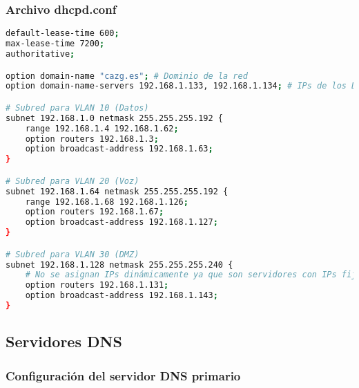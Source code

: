 \subsubsection{Archivo dhcpd.conf}
\label{Apendice2:dhcpd.conf}
\begin{lstlisting}[language=bash]
default-lease-time 600;
max-lease-time 7200;
authoritative;

option domain-name "cazg.es"; # Dominio de la red
option domain-name-servers 192.168.1.133, 192.168.1.134; # IPs de los DNS primario y secundario

# Subred para VLAN 10 (Datos)
subnet 192.168.1.0 netmask 255.255.255.192 {
    range 192.168.1.4 192.168.1.62;
    option routers 192.168.1.3; 
    option broadcast-address 192.168.1.63;
}

# Subred para VLAN 20 (Voz)
subnet 192.168.1.64 netmask 255.255.255.192 {
    range 192.168.1.68 192.168.1.126;
    option routers 192.168.1.67;
    option broadcast-address 192.168.1.127;
}

# Subred para VLAN 30 (DMZ)
subnet 192.168.1.128 netmask 255.255.255.240 {
    # No se asignan IPs dinámicamente ya que son servidores con IPs fijas
    option routers 192.168.1.131; 
    option broadcast-address 192.168.1.143;
} 
\end{lstlisting}

\subsection{Servidores DNS}
\label{Apendice2:configuracion_dns_red_completa}
\subsubsection{Configuración del servidor DNS primario}
\label{Apendice2:configuracion_dns_primario}
